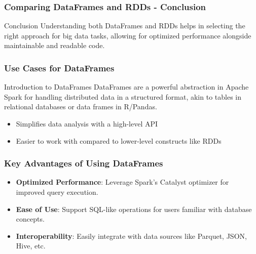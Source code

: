 \documentclass[aspectratio=169]{beamer}
\begin{document}
\begin{frame}[fragile]
    \frametitle{Comparing DataFrames and RDDs - Conclusion}
    \begin{block}{Conclusion}
        Understanding both DataFrames and RDDs helps in selecting the right approach for big data tasks, allowing for optimized performance alongside maintainable and readable code.
    \end{block}
\end{frame}

\begin{frame}
    \frametitle{Use Cases for DataFrames}
    \begin{block}{Introduction to DataFrames}
        DataFrames are a powerful abstraction in Apache Spark for handling distributed data in a structured format, akin to tables in relational databases or data frames in R/Pandas.
    \end{block}
    \begin{itemize}
        \item Simplifies data analysis with a high-level API
        \item Easier to work with compared to lower-level constructs like RDDs
    \end{itemize}
\end{frame}

\begin{frame}
    \frametitle{Key Advantages of Using DataFrames}
    \begin{itemize}
        \item \textbf{Optimized Performance}: Leverage Spark's Catalyst optimizer for improved query execution.
        \item \textbf{Ease of Use}: Support SQL-like operations for users familiar with database concepts.
        \item \textbf{Interoperability}: Easily integrate with data sources like Parquet, JSON, Hive, etc.
    \end{itemize}
\end{frame}
\end{document}

